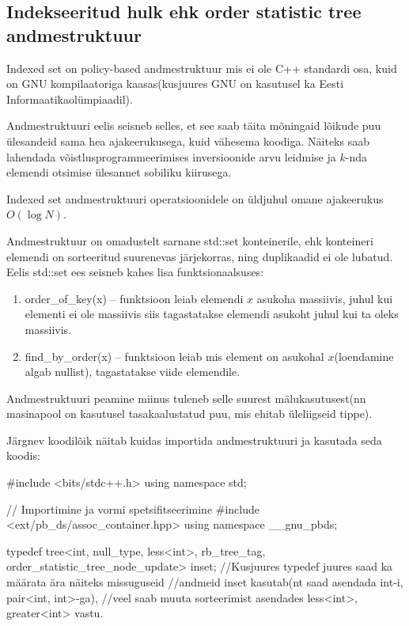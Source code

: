 \documentclass{trkut}
\begin{document}
\begin{appendices}
 \chapter{Indekseeritud hulk ehk order statistic tree andmestruktuur}\label{lisa13}
    \tiny
    \normalsize
Indexed set on policy-based andmestruktuur mis ei ole C++ standardi osa, kuid on GNU kompilaatoriga kaasas(kusjuures GNU on kasutusel ka Eesti Informaatikaolümpiaadil).

Andmestruktuuri eelis seisneb selles, et see saab täita mõningaid lõikude puu ülesandeid sama hea ajakeerukusega, kuid vähesema koodiga.
Näiteks saab lahendada võistlusprogrammeerimises inversioonide arvu leidmise ja $k$-nda elemendi otsimise ülesannet sobiliku kiirusega.

Indexed set andmestruktuuri operatsioonidele on üldjuhul omane ajakeerukus $O(\log N)$.

Andmestruktuur on omadustelt sarnane std::set konteinerile, ehk konteineri elemendi on sorteeritud suurenevas järjekorras, ning duplikaadid ei ole lubatud.
Eelis std::set ees seisneb kahes lisa funktsionaalsuses:
\begin{enumerate}
    \item order\_of\_key(x) -- funktsioon leiab elemendi $x$ asukoha massiivis, juhul kui elementi ei ole massiivis siis tagastatakse elemendi asukoht juhul kui ta oleks massiivis. 
    \item find\_by\_order(x) -- funktsioon leiab mis element on asukohal $x$(loendamine algab nullist), tagastatakse viide elemendile.
\end{enumerate}

Andmestruktuuri peamine miinus tuleneb selle suurest mälukasutusest(nn masinapool on kasutusel tasakaalustatud puu, mis ehitab üleliigseid tippe).

Järgnev koodilõik näitab kuidas importida andmestruktuuri ja kasutada seda koodis:

\begin{cclol}
    #include <bits/stdc++.h>
    using namespace std;

    // Importimine ja vormi spetsifitseerimine
    #include <ext/pb_ds/assoc_container.hpp>
    using namespace __gnu_pbds;
    
    typedef tree<int, null_type, less<int>, rb_tree_tag, 
    order_statistic_tree_node_update> inset;
//Kusjuures typedef juures saad ka määrata ära näiteks missuguseid 
//andmeid inset kasutab(nt saad asendada int-i, pair<int, int>-ga), 
//veel saab muuta sorteerimist asendades less<int>, greater<int> vastu.


\end{cclol}
\end{appendices}
\end{document}
